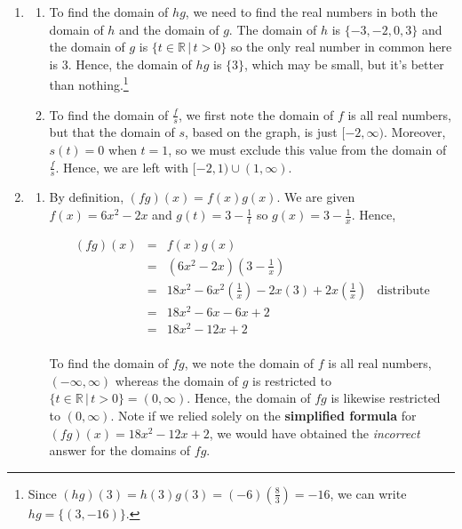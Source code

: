 \documentclass{ximera}
\begin{document}
\begin{example}
\begin{explanation}
\begin{enumerate}
\item \begin{enumerate}

\item To find the domain of $hg$, we need to find the real numbers in both the domain of $h$ and the domain of $g$.  The domain of $h$ is $\{ -3, -2, 0, 3 \}$ and the domain of $g$ is $\{ t \in \mathbb{R} \, | \, t > 0 \}$ so the only real number in common here is $3$.  Hence, the domain of $hg$ is $\{ 3\}$, which may be small, but it's better than nothing.\footnote{Since $(hg)(3) = h(3)g(3) = (-6)\left(\frac{8}{3}\right) = -16$, we can write $hg = \{ (3,-16) \}$.}

\item To find the domain of $\frac{f}{s}$, we first note the domain of $f$ is all real numbers, but that the domain of $s$, based on the graph, is just $[-2, \infty)$.  Moreover, $s(t) = 0$ when $t=1$, so we must exclude this value from the domain of $\frac{f}{s}$.  Hence, we are left with $[-2, 1) \cup (1, \infty)$.

\end{enumerate}

\item  

\begin{enumerate}

\item  By definition, $(fg)(x) = f(x)g(x)$.  We are given $f(x) = 6x^2-2x$ and $g(t) = 3 - \frac{1}{t}$ so $g(x) = 3 - \frac{1}{x}$.  Hence, 

\[ \begin{array}{rclr}


(fg)(x) & = & f(x)g(x) & \\
           & = &  \left( 6x^2-2x \right) \left( 3 - \frac{1}{x} \right) & \\
           & = &  18x^2 - 6x^2 \left(\frac{1}{x}\right) - 2x(3) + 2x \left(\frac{1}{x}\right)  & \text{distribute} \\
           & = & 18x^2 - 6x - 6x + 2 & \\
           & = & 18x^2 - 12x + 2 & \\ \end{array} \]
           
To find the domain of $fg$, we note the domain of $f$ is all real numbers, $(-\infty, \infty)$ whereas the domain of $g$ is restricted to $\{ t \in \mathbb{R} \, | \, t > 0 \} = (0, \infty)$.  Hence, the domain of $fg$ is likewise restricted to $(0, \infty)$.  Note if we relied solely on the \textbf{simplified formula} for $(fg)(x) = 18x^2 - 12x + 2$, we would have obtained the \textit{incorrect} answer for the domains of $fg$.  


\end{enumerate}
\end{enumerate}
\end{explanation}
\end{example}
\end{document}
